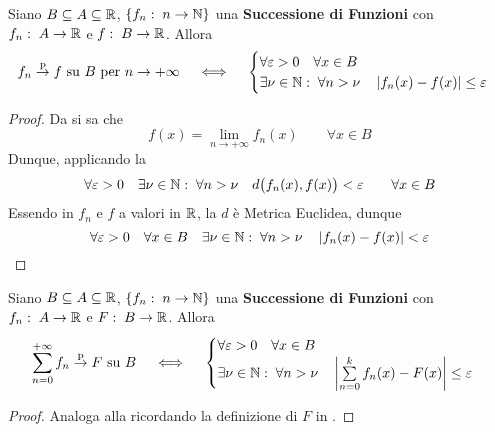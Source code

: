 \begin{proposition}
	\label{prop:conv_punt_lim_succ}
	Siano $B \subseteq A \subseteq \mathbb{R}$, $\left\{f_n:\; n \to \mathbb{N}\right\}$ una \textbf{Successione di Funzioni} con $f_n:\; A \to \mathbb{R}$ e $f:\; B \to \mathbb{R}$. Allora
	\[
		f_n \overset{\text{p}}{\to} f \text{ su } B \text{ per } n \to +\infty
		\quad \iff \quad
		\begin{cases}
			\forall \varepsilon > 0 \quad \forall x \in B\\
			\exists \nu \in \mathbb{N}:\; \forall n > \nu \quad \left|f_n(x) - f(x)\right| \leq \varepsilon
		\end{cases}
	\]
	\begin{proof}
		Da  si sa che
		\[f(x) = \lim\limits_{n \to +\infty} f_n(x) \qquad \forall x \in B\]
		Dunque, applicando la 
		\[
			\forall\varepsilon > 0 \quad \exists\nu\in\mathbb{N}:\; \forall n > \nu \quad d \bigl( f_n(x), f(x) \bigr) < \varepsilon  \qquad \forall x \in B
		\]
		Essendo in $f_n$ e $f$ a valori in $\mathbb{R}$, la $d$ è Metrica Euclidea, dunque
		\[
			\forall\varepsilon > 0 \quad \forall x \in B \quad \exists\nu\in\mathbb{N}:\; \forall n > \nu \quad \left|f_n(x) - f(x)\right| < \varepsilon
		\]
	\end{proof}
\end{proposition}
\begin{proposition}
	Siano $B \subseteq A \subseteq \mathbb{R}$, $\left\{f_n:\; n \to \mathbb{N}\right\}$ una \textbf{Successione di Funzioni} con $f_n:\; A \to \mathbb{R}$ e $F:\; B \to \mathbb{R}$. Allora
	\[
		\sum\limits_{n = 0}^{+\infty} f_n \overset{\text{p}}{\to} F \text{ su } B
		\quad \iff \quad
		\begin{cases}
			\forall \varepsilon > 0 \quad \forall x \in B\\
			\exists \nu \in \mathbb{N}:\; \forall n > \nu \quad \left|\sum\limits_{n = 0}^{k} f_n(x) - F(x)\right| \leq \varepsilon
		\end{cases}
	\]
	\begin{proof}
		Analoga alla  ricordando la definizione di $F$ in .
	\end{proof}
\end{proposition}

